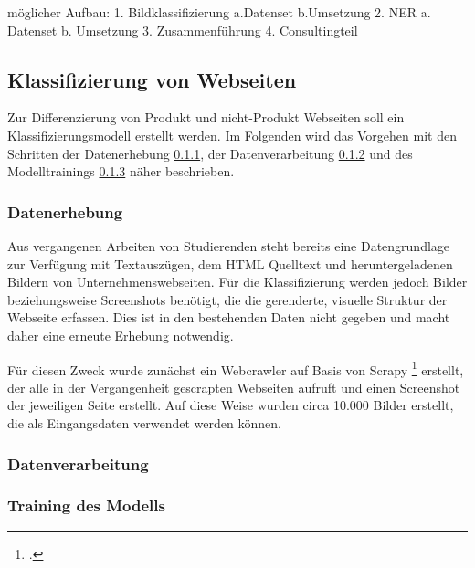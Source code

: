 möglicher Aufbau:
1.	Bildklassifizierung
	a.Datenset
	b.Umsetzung
2.	NER
	a.	Datenset
	b.	Umsetzung
3.	Zusammenführung
4.	Consultingteil

\subsection{Klassifizierung von Webseiten} \label{subsec_klassifierung_websites}
Zur Differenzierung von Produkt und nicht-Produkt Webseiten soll ein Klassifizierungsmodell erstellt werden.
Im Folgenden wird das Vorgehen mit den Schritten der Datenerhebung \ref{subsubsec_class_datenerhebung}, der Datenverarbeitung \ref{subsubsec_class_datenverarbeitung} und des Modelltrainings \ref{subsubsec_class_training} näher beschrieben.
\subsubsection{Datenerhebung} \label{subsubsec_class_datenerhebung}
Aus vergangenen Arbeiten von Studierenden steht bereits eine Datengrundlage zur Verfügung mit Textauszügen, dem HTML Quelltext und heruntergeladenen Bildern von Unternehmenswebseiten.
Für die Klassifizierung werden jedoch Bilder beziehungsweise Screenshots benötigt, die die gerenderte, visuelle Struktur der Webseite erfassen.
Dies ist in den bestehenden Daten nicht gegeben und macht daher eine erneute Erhebung notwendig.

Für diesen Zweck wurde zunächst ein Webcrawler auf Basis von Scrapy \footcite[\vglf][]{zotero-328} erstellt, der alle in der Vergangenheit gescrapten Webseiten aufruft und einen Screenshot der jeweiligen Seite erstellt.
Auf diese Weise wurden circa 10.000 Bilder erstellt, die als Eingangsdaten verwendet werden können.
\subsubsection{Datenverarbeitung} \label{subsubsec_class_datenverarbeitung}
\subsubsection{Training des Modells} \label{subsubsec_class_training}
